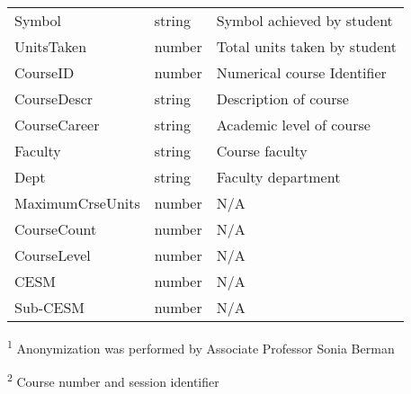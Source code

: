 \begin{table}[H]
\begin{threeparttable}
\begin{tabularx}{\textwidth}{>{\hsize=0.8\hsize}X>{\hsize=0.6\hsize}X>{\hsize=1.6\hsize}X}
            Symbol             & string            & Symbol achieved by student                       \\
            UnitsTaken         & number            & Total units taken by student                     \\
            CourseID           & number            & Numerical course Identifier                      \\
            CourseDescr        & string            & Description of course                            \\
            CourseCareer       & string            & Academic level of course                         \\
            Faculty            & string            & Course faculty                                   \\
            Dept               & string            & Faculty department                               \\
            MaximumCrseUnits   & number            & N/A                                              \\
            CourseCount        & number            & N/A                                              \\
            CourseLevel        & number            & N/A                                              \\
            CESM               & number            & N/A                                              \\
            Sub-CESM           & number            & N/A                                              \\
            \bottomrule
        \end{tabularx}
        \scriptsize
        \begin{tablenotes}
            \item[\textsuperscript{1}]Anonymization was performed by Associate Professor Sonia Berman
            \item[\textsuperscript{2}]Course number and session identifier
        \end{tablenotes}
    \end{threeparttable}
\end{table}